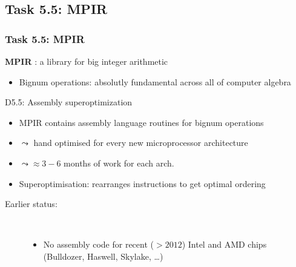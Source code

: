 \documentclass{beamer}
\begin{document}
\subsection{Task 5.5: MPIR}
\begin{frame}
  \frametitle{Task 5.5: MPIR}
\begin{center}
  {\Large  \textbf{MPIR} : a library for big integer arithmetic}
\end{center}
\begin{itemize}
  \item Bignum operations: absolutly fundamental across all of computer algebra
  \end{itemize}

  \begin{block}
    {D5.5: Assembly superoptimization}
    \begin{itemize}
    \item MPIR contains assembly language routines for bignum operations
    \item $\leadsto$ hand optimised for every new microprocessor
      architecture
    \item $\leadsto \approx 3-6$ months of work for each arch.
    \item Superoptimisation: rearranges instructions to get optimal
      ordering
    \end{itemize}

    \begin{description}
      \item[Earlier status:]\
        \begin{itemize}
        \item No assembly code for recent ($> 2012$) Intel and AMD chips (Bulldozer,
          Haswell, Skylake, \dots)
        \end{itemize}
            \end{description}



    \end{block}
\end{frame}
\end{document}
